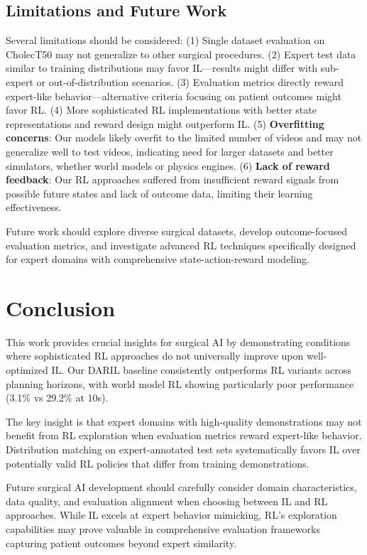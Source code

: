 \documentclass[runningheads]{llncs}
\begin{document}
\subsection{Limitations and Future Work}

Several limitations should be considered: (1) Single dataset evaluation on CholecT50 may not generalize to other surgical procedures. (2) Expert test data similar to training distributions may favor IL—results might differ with sub-expert or out-of-distribution scenarios. (3) Evaluation metrics directly reward expert-like behavior—alternative criteria focusing on patient outcomes might favor RL. (4) More sophisticated RL implementations with better state representations and reward design might outperform IL. (5) \textbf{Overfitting concerns}: Our models likely overfit to the limited number of videos and may not generalize well to test videos, indicating need for larger datasets and better simulators, whether world models or physics engines. (6) \textbf{Lack of reward feedback}: Our RL approaches suffered from insufficient reward signals from possible future states and lack of outcome data, limiting their learning effectiveness.

Future work should explore diverse surgical datasets, develop outcome-focused evaluation metrics, and investigate advanced RL techniques specifically designed for expert domains with comprehensive state-action-reward modeling.

\section{Conclusion}

This work provides crucial insights for surgical AI by demonstrating conditions where sophisticated RL approaches do not universally improve upon well-optimized IL. Our DARIL baseline consistently outperforms RL variants across planning horizons, with world model RL showing particularly poor performance (3.1\% vs 29.2\% at 10s).

The key insight is that expert domains with high-quality demonstrations may not benefit from RL exploration when evaluation metrics reward expert-like behavior. Distribution matching on expert-annotated test sets systematically favors IL over potentially valid RL policies that differ from training demonstrations.

Future surgical AI development should carefully consider domain characteristics, data quality, and evaluation alignment when choosing between IL and RL approaches. While IL excels at expert behavior mimicking, RL's exploration capabilities may prove valuable in comprehensive evaluation frameworks capturing patient outcomes beyond expert similarity.
\end{document}
